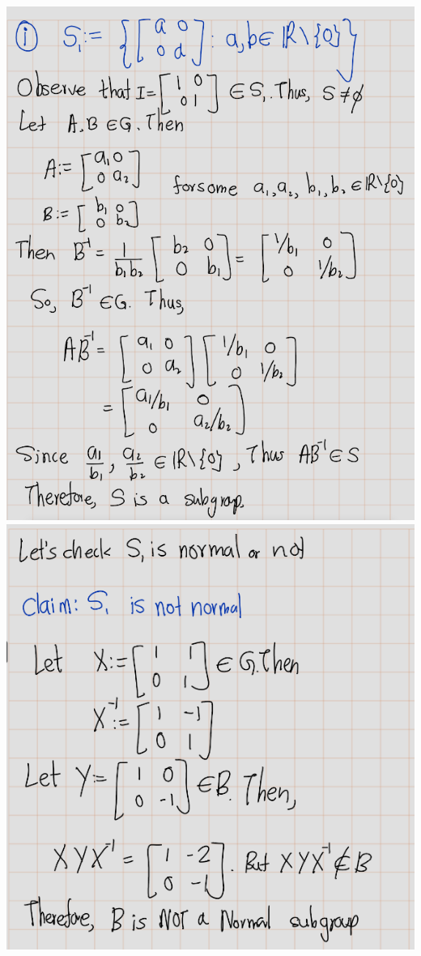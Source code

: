 \documentclass[
]{book}
\theoremstyle{definition}
\theoremstyle{definition}
\theoremstyle{definition}
\theoremstyle{definition}
\theoremstyle{remark}
\begin{document}
\includegraphics{figures/ch_2/fig40.png}
\includegraphics{figures/ch_2/fig41.png}
\end{document}

